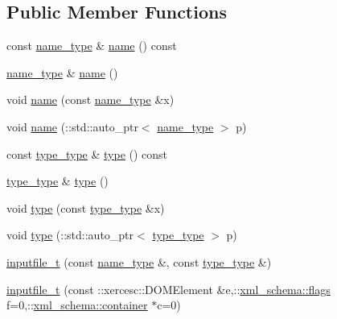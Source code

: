\subsection*{Public Member Functions}
\begin{DoxyCompactItemize}
\item 
const \hyperlink{classinputfile__t_a78bf4131e7e2a433bfe95f85b2a5e1da}{name\-\_\-type} \& \hyperlink{classinputfile__t_a421b173ebce0a604ecc24e7144bebfd1}{name} () const 
\item 
\hyperlink{classinputfile__t_a78bf4131e7e2a433bfe95f85b2a5e1da}{name\-\_\-type} \& \hyperlink{classinputfile__t_af07afab2e4b5fcfded1980b068f47648}{name} ()
\item 
void \hyperlink{classinputfile__t_ab64c88264ed68fd54807a62853994662}{name} (const \hyperlink{classinputfile__t_a78bf4131e7e2a433bfe95f85b2a5e1da}{name\-\_\-type} \&x)
\item 
void \hyperlink{classinputfile__t_ab0fd338383c85ac998025f4f0c10d63f}{name} (\-::std\-::auto\-\_\-ptr$<$ \hyperlink{classinputfile__t_a78bf4131e7e2a433bfe95f85b2a5e1da}{name\-\_\-type} $>$ p)
\item 
const \hyperlink{classinputfile__t_a3f28e99146a586a8f55154818cdfe1ad}{type\-\_\-type} \& \hyperlink{classinputfile__t_a365e0471f78ac9f457471f93a44093dc}{type} () const 
\item 
\hyperlink{classinputfile__t_a3f28e99146a586a8f55154818cdfe1ad}{type\-\_\-type} \& \hyperlink{classinputfile__t_a17a37451ba128f3f05eeef4a80a84193}{type} ()
\item 
void \hyperlink{classinputfile__t_a0308f273b0ee4c4d687bbc33ccdb3b0c}{type} (const \hyperlink{classinputfile__t_a3f28e99146a586a8f55154818cdfe1ad}{type\-\_\-type} \&x)
\item 
void \hyperlink{classinputfile__t_a5f1a595db6d70d79d173a63511a45a6b}{type} (\-::std\-::auto\-\_\-ptr$<$ \hyperlink{classinputfile__t_a3f28e99146a586a8f55154818cdfe1ad}{type\-\_\-type} $>$ p)
\item 
\hyperlink{classinputfile__t_ac5caf96746fcce27a5636c2decb4979b}{inputfile\-\_\-t} (const \hyperlink{classinputfile__t_a78bf4131e7e2a433bfe95f85b2a5e1da}{name\-\_\-type} \&, const \hyperlink{classinputfile__t_a3f28e99146a586a8f55154818cdfe1ad}{type\-\_\-type} \&)
\item 
\hyperlink{classinputfile__t_a818f579ee694957e72740e373848fca5}{inputfile\-\_\-t} (const \-::xercesc\-::\-D\-O\-M\-Element \&e,\-::\hyperlink{namespacexml__schema_a0612287d030cb2732d31a45b258fdc87}{xml\-\_\-schema\-::flags} f=0,\-::\hyperlink{namespacexml__schema_ada9aa30dc722e93ee2ed7243085402a5}{xml\-\_\-schema\-::container} $\ast$c=0)

\end{DoxyCompactItemize}
